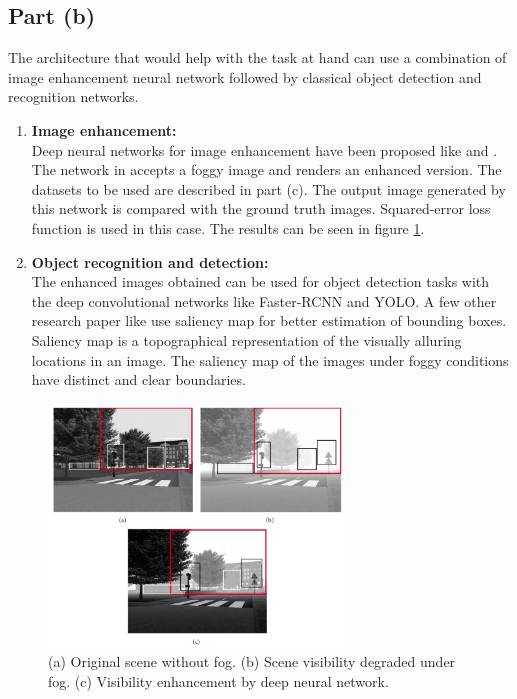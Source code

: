 \documentclass[twosided]{article}
\begin{document}
\subsection{Part (b)}
The architecture that would help with the task at hand can use a combination of image enhancement neural network followed by classical object detection and recognition networks.
\begin{enumerate}
    \item \textbf{Image enhancement:} \\
    Deep neural networks for image enhancement have been proposed like \cite{DeepPhoto} and \cite{EnhanceImage}. The network in \cite{EnhanceImage} accepts a foggy image and renders an enhanced version. The datasets to be used are described in part (c). The output image generated by this network is compared with the ground truth images. Squared-error loss function is used in this case. The results can be seen in figure \ref{fig:figure2}.
    \item \textbf{Object recognition and detection:} \\
    The enhanced images obtained can be used for object detection tasks with the deep convolutional networks like Faster-RCNN and YOLO. A few other research paper like \cite{Salient} use saliency map for better estimation of bounding boxes. Saliency map is a topographical representation of the visually alluring locations in an image. The saliency map of the images under foggy conditions have distinct and clear boundaries.  
\end{enumerate}

\begin{figure}[h]
    \centering
    \includegraphics[width=0.7\textwidth]{images/Figure2.png}
    \caption{(a) Original scene without fog. (b) Scene visibility degraded under fog. (c) Visibility enhancement by deep neural network.}
    \label{fig:figure2}
\end{figure}  
\end{document}
